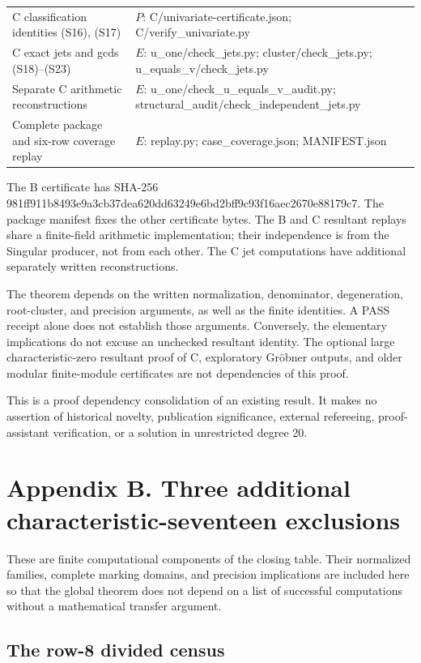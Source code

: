 \documentclass[
  british,
  10pt,
  a4paper,
]{article}
\begin{document}
{\begin{longtable}[]{@{}
  >{\raggedright\arraybackslash}p{}
  >{\raggedright\arraybackslash}p{}@{}}
C classification identities (S16), (S17) & \(P\):
C/univariate-certificate.json; C/verify\_univariate.py \\
C exact jets and gcds (S18)--(S23) & \(E\): u\_one/check\_jets.py;
cluster/check\_jets.py; u\_equals\_v/check\_jets.py \\
Separate C arithmetic reconstructions & \(E\):
u\_one/check\_u\_equals\_v\_audit.py;
structural\_audit/check\_independent\_jets.py \\
Complete package and six-row coverage replay & \(E\): replay.py;
case\_coverage.json; MANIFEST.json \\
\end{longtable}
}

The B certificate has SHA-256
981ff911b8493e9a3cb37dea620dd63249e6bd2bff9c93f16aec2670e88179c7. The
package manifest fixes the other certificate bytes. The B and C
resultant replays share a finite-field arithmetic implementation; their
independence is from the Singular producer, not from each other. The C
jet computations have additional separately written reconstructions.

The theorem depends on the written normalization, denominator,
degeneration, root-cluster, and precision arguments, as well as the
finite identities. A PASS receipt alone does not establish those
arguments. Conversely, the elementary implications do not excuse an
unchecked resultant identity. The optional large characteristic-zero
resultant proof of C, exploratory Gröbner outputs, and older modular
finite-module certificates are not dependencies of this proof.

This is a proof dependency consolidation of an existing result. It makes
no assertion of historical novelty, publication significance, external
refereeing, proof-assistant verification, or a solution in unrestricted
degree 20.

\section{Appendix B. Three additional characteristic-seventeen
exclusions}\label{appendix-b.-three-additional-characteristic-seventeen-exclusions}

These are finite computational components of the closing table. Their
normalized families, complete marking domains, and precision
implications are included here so that the global theorem does not
depend on a list of successful computations without a mathematical
transfer argument.

\subsection{The row-8 divided census}\label{the-row-8-divided-census}
\end{document}
